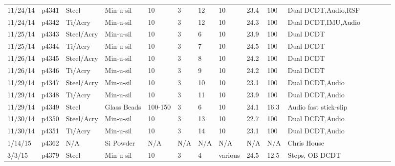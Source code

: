 \begin{landscape}
\begin{longtable} {lllllllllllllll}
11/24/14 & p4341      & Steel            & Min-u-sil    & 10           & 3         & 12            & 10                           & 23.4        & 100      & Dual DCDT,Audio,RSF\\
11/24/14 & p4342      & Ti/Acry & Min-u-sil    & 10           & 3         & 12            & 10                           & 24.3        & 100      & Dual DCDT,IMU,Audio\\
11/25/14 & p4343      & Steel/Acry    & Min-u-sil    & 10           & 3         & 6             & 10                           & 23.9        & 100      & Dual DCDT\\
11/25/14 & p4344      & Ti/Acry & Min-u-sil    & 10           & 3         & 7             & 10                           & 24.5        & 100      & Dual DCDT\\
11/26/14 & p4345      & Steel/Acry    & Min-u-sil    & 10           & 3         & 8             & 10                           & 24.2        & 100      & Dual DCDT\\
11/26/14 & p4346      & Ti/Acry & Min-u-sil    & 10           & 3         & 9             & 10                           & 24.2        & 100      & Dual DCDT\\
11/29/14 & p4347      & Steel/Acry    & Min-u-sil    & 10           & 3         & 10            & 10                           & 23.1        & 100      & Dual DCDT,Audio\\
11/29/14 & p4348      & Ti/Acry & Min-u-sil    & 10           & 3         & 11            & 10                           & 23.9        & 100      & Dual DCDT,Audio\\
11/29/14 & p4349      & Steel            & Glass Beads  & 100-150      & 3         & 6             & 10                           & 24.1        & 16.3     & Audio fast stick-slip\\
11/30/14 & p4350      & Steel/Acry    & Min-u-sil    & 10           & 3         & 13            & 10                           & 22.7        & 100      & Dual DCDT,Audio\\
11/30/14 & p4351      & Ti/Acry & Min-u-sil    & 10           & 3         & 14            & 10                           & 23.1        & 100      & Dual DCDT,Audio\\
1/14/15  & p4362      & N/A              & Si Powder    & N/A          & N/A       & N/A           & N/A                          & N/A         & N/A      & Chris House\\
3/3/15   & p4379      & Steel            & Min-u-sil    & 10           & 3         & 4             & various                      & 24.5        & 12.5     & Steps, OB DCDT\\

\end{longtable}
\end{landscape}
